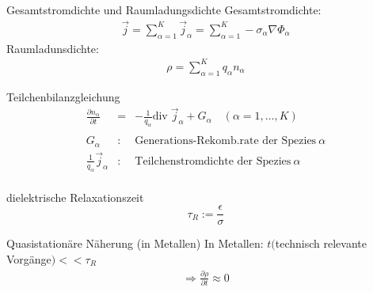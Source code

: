 \documentclass[a6paper]{kartei}
\renewcommand{\div}{\mathrm{div}\;}
\begin{document}
\begin{karte}{Gesamtstromdichte und Raumladungsdichte}
Gesamtstromdichte:
 \begin{eqnarray*}
  \vec{j} = \sum \limits_{\alpha = 1}^{K} \vec{j}_{\alpha} =\sum \limits_{\alpha = 1}^{K}  -\sigma_\alpha \nabla \Phi_\alpha
\end{eqnarray*}
Raumladunsdichte:
\begin{eqnarray*}
  \rho =  \sum \limits_{\alpha = 1}^{K} q_{\alpha} n_{\alpha} 
 \end{eqnarray*}
\end{karte}



\begin{karte}{Teilchenbilanzgleichung}
 \begin{eqnarray*}
  \frac{\partial n_{\alpha}}{\partial t} & = & - \frac{1}{q_{\alpha}} \div \vec{j}_{\alpha} + G_{\alpha} \quad (\alpha = 1, \dots , K) \\
 \nonumber \\  
G_{\alpha} & : & \text{Generations-Rekomb.rate der Spezies} \ \alpha \nonumber \\
\frac{1}{q_{\alpha}} \vec{j}_{\alpha} & : & \text{Teilchenstromdichte der Spezies} \ \alpha \nonumber \\
 \end{eqnarray*}

\end{karte}


\begin{karte}{dielektrische Relaxationszeit}
$$\tau_{R} := \frac{\epsilon}{\sigma}$$
\end{karte}

\begin{karte}{Quasistationäre Näherung (in Metallen)}
In Metallen: $t($technisch relevante Vorgänge$) << \tau_{R}$ 
\begin{eqnarray*}
  \Rightarrow \frac{\partial \rho}{\partial t} \approx 0
 \end{eqnarray*}
\end{karte}
\end{document}

